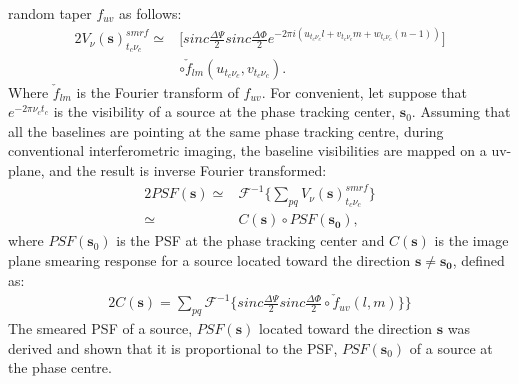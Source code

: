 random taper $f_{uv}$ as follows:
\begin{alignat}{2}
V_{\nu}(\mathbf{s})^{smrf}_{t_c \nu_c} \simeq &  \big[sinc\frac{\Delta \Psi}{2}sinc\frac{\Delta \Phi}{2}e^{-2\pi i (u_{t_c\nu_c}l+v_{t_c\nu_c}m+w_{t_c\nu_c}(n-1))}
\big]\\
&\circ \check{f}_{lm}(u_{t_c\nu_c},v_{t_c\nu_c})\label{eq:5}.
\end{alignat}
Where $\check{f}_{lm}$ is the Fourier transform of $f_{uv}$.
For convenient, let suppose that $e^{−2\pi\nu_ct_c}$ is the visibility of a source at the phase tracking center, $\mathbf{s}_0$. Assuming
that all the baselines are pointing at the same phase tracking centre, during conventional interferometric imaging,
the baseline visibilities are mapped on a uv-plane, and the result is inverse Fourier transformed:
\begin{alignat}{2}
PSF(\mathbf{s}) \simeq & \mathcal{F}^{-1}\Big\{\sum_{pq}V_{\nu}(\mathbf{s})^{smrf}_{t_c \nu_c}\big\}\\
		\simeq & C(\mathbf{s})\circ PSF(\mathbf{s_0}),
\end{alignat}
where $PSF(\mathbf{s}_0)$ is the PSF at the phase tracking center
and $C(\mathbf{s})$ is the image plane smearing response for a source
located toward the direction $\mathbf{s}\neq \mathbf{s_0}$, defined as:
\begin{alignat}{2}
C(\mathbf{s}) = \sum_{pq}\mathcal{F}^{-1}\Big\{sinc\frac{\Delta \Psi}{2}sinc\frac{\Delta \Phi}{2}\circ \check{f}_{uv}(l,m)\}\Big\}
\end{alignat}
The smeared PSF of a source, $PSF(\mathbf{s})$ located toward the
direction $\mathbf{s}$ was derived and shown that it is proportional
to the PSF, $PSF(\mathbf{s}_0)$ of a source at the phase centre.




